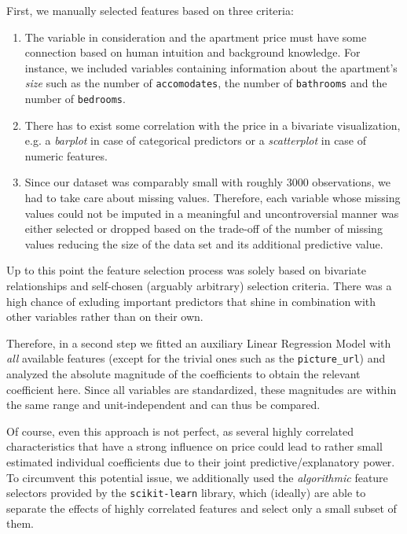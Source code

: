 \documentclass[12pt, letterpaper]{article}
\begin{document}
First, we manually selected features based on three criteria:
\begin{enumerate}
    \item The variable in consideration and the apartment price must have some connection based on human intuition and background knowledge. For instance, we included variables containing information about the apartment's \emph{size} such as the number of \texttt{accomodates}, the number of \texttt{bathrooms} and the number of \texttt{bedrooms}.
    \item There has to exist some correlation with the price in a bivariate visualization, e.g. a \emph{barplot} in case of categorical predictors or a \emph{scatterplot} in case of numeric features.
    \item Since our dataset was comparably small with roughly $3000$ observations, we had to take care about missing values.
          Therefore, each variable whose missing values could not be imputed in a meaningful and uncontroversial manner was either selected or dropped based on the trade-off of the number of missing values reducing the size of the data set and its additional predictive value.
\end{enumerate}

Up to this point the feature selection process was solely based on bivariate relationships and self-chosen (arguably arbitrary) selection criteria.
There was a high chance of exluding important predictors that shine in combination with other variables rather than on their own.

Therefore, in a second step we fitted an auxiliary Linear Regression Model with \emph{all} available features (except for the trivial ones such as the \verb|picture_url|) and analyzed the absolute magnitude of the coefficients to obtain the relevant coefficient here.
Since all variables are standardized, these magnitudes are within the same range and unit-independent and can thus be compared.

Of course, even this approach is not perfect, as several highly correlated characteristics that have a strong influence on price could lead to rather small estimated individual coefficients due to their joint predictive/explanatory power.
To circumvent this potential issue, we additionally used the \emph{algorithmic} feature selectors provided by the \texttt{scikit-learn} library, which (ideally) are able to separate the effects of highly correlated features and select only a small subset of them.
\end{document}
